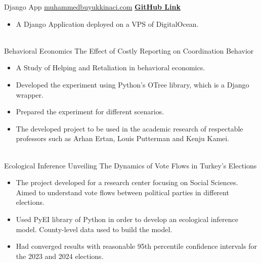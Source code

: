 \documentclass[letterpaper]{DS_class_file} %
\begin{document}
\begin{twenty} %
    
	\twentyitem
	{Django}
	{App}
	{\hspace{0.3cm}\href{https://muhammedbuyukkinaci.com}{muhammedbuyukkinaci.com}}
	{\href{https://github.com/MuhammedBuyukkinaci/muhammedbuyukkinaci.com}{\textbf{GitHub Link}}}
	{}
	{
		{\begin{itemize}
				\item A Django Application deployed on a VPS of DigitalOcean.
		\end{itemize}}
	}
	\\
        \twentyitem
	{Behavioral}
	{Economics}
	{\hspace{0.3cm}The Effect of Costly Reporting on Coordination Behavior}
	{}
	{}
	{
		{\begin{itemize}
                    \item A Study of Helping and Retaliation in behavioral economics.
                    \item Developed the experiment using Python's OTree library, which is a Django wrapper. 
                    \item Prepared the experiment for different scenarios.
                    \item The developed project to be used in the academic research of \newline respectable professors such as Arhan Ertan, Louis Putterman and Kenju Kamei.
		\end{itemize}}
	}
	\\
        \twentyitem
	{Ecological}
	{Inference}
	{\hspace{0.3cm}Unveiling The Dynamics of Vote Flows in Turkey's Elections}
	{}
	{}
	{
		{\begin{itemize}
                    \item The project developed for a research center focusing on Social Sciences. Aimed to understand vote flows between political parties in different elections.
                    \item Used PyEI library of Python in order to develop an ecological inference model. County-level data used to build the model.
                    \item Had converged results with reasonable 95th percentile confidence intervals for the 2023 and 2024 elections.
		\end{itemize}}
	}
	\\
	

\end{twenty}
\end{document}

